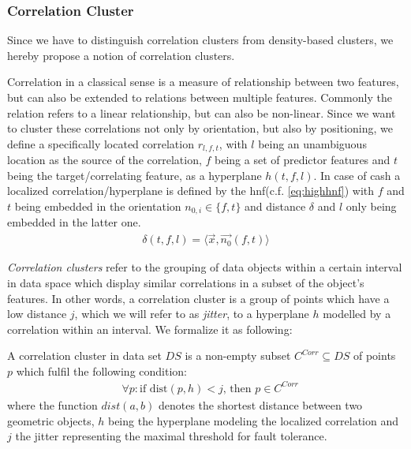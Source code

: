 \subsubsection*{Correlation Cluster}
Since we have to distinguish correlation clusters from density-based clusters, we hereby propose a notion of correlation clusters.

Correlation in a classical sense is a measure of relationship between two features, but can also be extended to relations between multiple features. Commonly the relation refers to a linear relationship, but can also be non-linear. Since we want to cluster these correlations not only by orientation, but also by positioning, we define a specifically located correlation $r_{l,f,t}$, with $l$ being an unambiguous location as the source of the correlation, $f$ being a set of predictor features and $t$ being the target/correlating feature, as a hyperplane $h(t,f,l)$. In case of \gls{cash} a localized correlation/hyperplane is defined by the \gls{hnf}(c.f. \autoref{eq:highhnf}) with $f$ and $t$ being embedded in the orientation $n_{0,i} \in \{f,t\}$ and distance $\delta$ and $l$ only being embedded in the latter one. 
\begin{align}
    \delta(t,f,l) = \langle \vec{x},\vec{n_0}(f,t) \rangle
\end{align}

\textit{Correlation clusters} refer to the grouping of data objects within a certain interval in data space which display similar correlations in a subset of the object's features. In other words, a correlation cluster is a group of points which have a low distance $j$, which we will refer to as \textit{jitter}, to a hyperplane $h$ modelled by a correlation within an interval. We formalize it as following:

A correlation cluster in data set $DS$ is a non-empty subset $C^{Corr} \subseteq DS$ of points $p$ which fulfil the following condition:
\begin{align}\label{eq:pointtohyplane}
    &\forall p: \text{if } \text{dist}(p,h) < j \text{, then } p \in C^{Corr}
\end{align}
where the function $dist(a,b)$ denotes the shortest distance between two geometric objects, $h$ being the hyperplane modeling the localized correlation and $j$ the jitter representing the maximal threshold for fault tolerance. 



